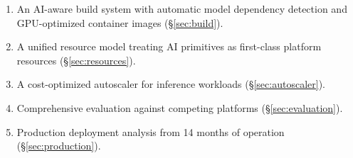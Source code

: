 \begin{enumerate}[leftmargin=1.4em]
    \item An AI-aware build system with automatic model dependency detection and GPU-optimized container images (\S\ref{sec:build}).
    \item A unified resource model treating AI primitives as first-class platform resources (\S\ref{sec:resources}).
    \item A cost-optimized autoscaler for inference workloads (\S\ref{sec:autoscaler}).
    \item Comprehensive evaluation against competing platforms (\S\ref{sec:evaluation}).
    \item Production deployment analysis from 14 months of operation (\S\ref{sec:production}).
\end{enumerate}


